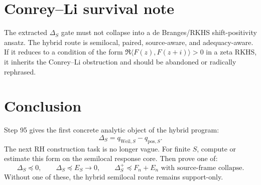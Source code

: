 \documentclass[11pt]{article}
\newcommand{\Pos}{\mathrm{pos}}
\newcommand{\Weil}{\mathrm{Weil}}
\begin{document}
\section{Conrey--Li survival note}
The extracted $\Delta_S$ gate must not collapse into a de Branges/RKHS shift-positivity ansatz.  The hybrid route is semilocal, paired, source-aware, and adequacy-aware.  If it reduces to a condition of the form $\Re\langle F(z),F(z+i)\rangle>0$ in a zeta RKHS, it inherits the Conrey--Li obstruction and should be abandoned or radically rephrased.

\section{Conclusion}
Step 95 gives the first concrete analytic object of the hybrid program:
\[
\boxed{
\Delta_S=q_{\Weil,S}-q_{\Pos,S}.
}
\]
The next RH construction task is no longer vague.  For finite $S$, compute or estimate this form on the semilocal response core.  Then prove one of:
\[
\Delta_S\preceq0,
\qquad
\Delta_S\preceq E_S\to0,
\qquad
\Delta_S^+\preceq F_n+E_n
\text{ with source-frame collapse.}
\]
Without one of these, the hybrid semilocal route remains support-only.
\end{document}
